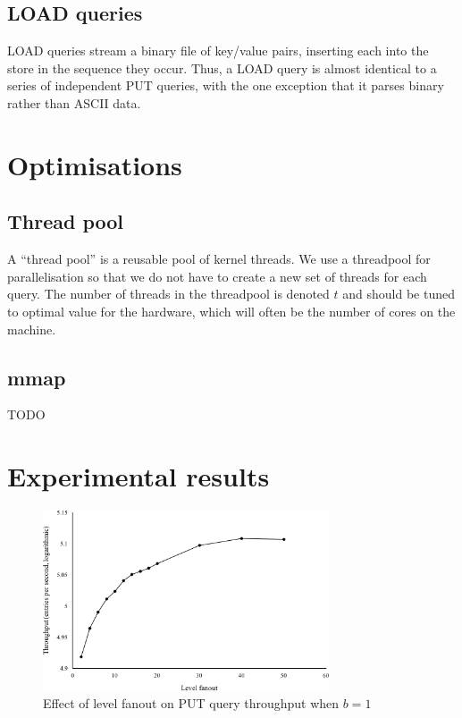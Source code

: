 \documentclass{acm}
\begin{document}
\subsection{LOAD queries}

LOAD queries stream a binary file of key/value pairs, inserting each into the store in the sequence they occur. Thus, a LOAD query is almost identical to a series of independent PUT queries, with the one exception that it parses binary rather than ASCII data.

\section{Optimisations}

\subsection{Thread pool}

A ``thread pool'' is a reusable pool of kernel threads. We use a threadpool for parallelisation so that we do not have to create a new set of threads for each query. The number of threads in the threadpool is denoted $t$ and should be tuned to optimal value for the hardware, which will often be the number of cores on the machine.

\subsection{mmap}

TODO

\section{Experimental results}

\begin{figure}
\centering
\includegraphics[width=3.33in]{fanout}
\caption{Effect of level fanout on PUT query throughput when $b=1$}
\end{figure}
\end{document}
